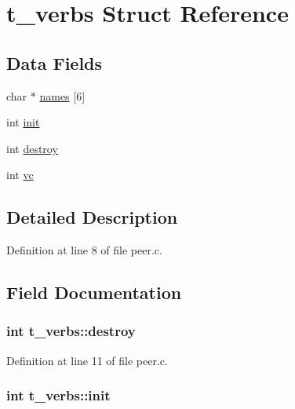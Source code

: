 \hypertarget{structt__verbs}{\section{t\-\_\-verbs Struct Reference}
\label{structt__verbs}
}
\subsection*{Data Fields}
\begin{DoxyCompactItemize}
\item 
char $\ast$ \hyperlink{structt__verbs_af1c2f7666f6e1dc69cd11da8d6ceee15}{names} \mbox{[}6\mbox{]}
\item 
int \hyperlink{structt__verbs_abd09e8bc8e0e8e01b2cff4f461927f54}{init}
\item 
int \hyperlink{structt__verbs_ab3d64ec82d84a66d1f7b0598f1d7e88a}{destroy}
\item 
int \hyperlink{structt__verbs_ad987fd901ce7ac02aa963245ae47a361}{vc}
\end{DoxyCompactItemize}


\subsection{Detailed Description}


Definition at line 8 of file peer.\-c.



\subsection{Field Documentation}
\hypertarget{structt__verbs_ab3d64ec82d84a66d1f7b0598f1d7e88a}{
\subsubsection[{destroy}]{\setlength{\rightskip}{0pt plus 5cm}int t\-\_\-verbs\-::destroy}}\label{structt__verbs_ab3d64ec82d84a66d1f7b0598f1d7e88a}


Definition at line 11 of file peer.\-c.

\hypertarget{structt__verbs_abd09e8bc8e0e8e01b2cff4f461927f54}{
\subsubsection[{init}]{\setlength{\rightskip}{0pt plus 5cm}int t\-\_\-verbs\-::init}}\label{structt__verbs_abd09e8bc8e0e8e01b2cff4f461927f54}


